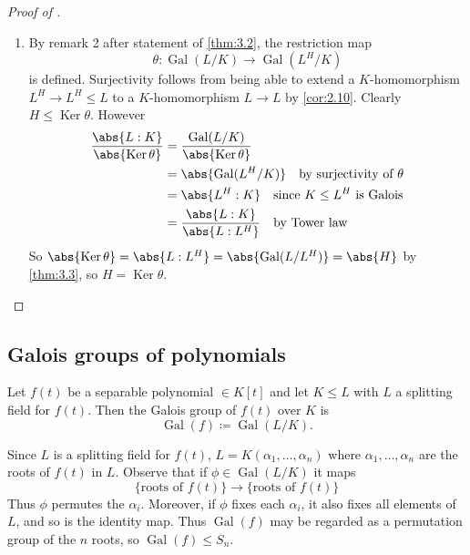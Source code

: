 \documentclass{article}
\DeclareMathOperator{\Gal}{Gal}
\DeclareMathOperator{\Ker}{Ker}
\begin{document}
\begin{proof}[Proof of ]
\begin{enumerate}[label=(\roman*)]
        \item By remark 2 after statement of \cref{thm:3.2}, the restriction map
            \begin{equation*}\theta:\Gal(L/K) \rightarrow \Gal(L^H/K)\end{equation*}
            is defined.
            Surjectivity follows from being able to extend a $K$-homomorphism $L^H \to L^H \leq L$ to a $K$-homomorphism $L \to L$ by \cref{cor:2.10}.
            Clearly $H \leq \Ker \theta$. However
            \begin{align*}
                \frac{\abs{L:K}}{\abs{\Ker \theta}} &= \frac{\Gal(L/K)}{\abs{\Ker \theta}} \\
                                                    &= \abs{\Gal(L^H/K)} \quad \text{by surjectivity of } \theta \\
                                                    &= \abs{L^H:K} \quad \text{since } K \leq L^H \text{ is Galois} \\
                                                    &= \frac{\abs{L:K}}{\abs{L:L^H}} \quad \text{by Tower law}
            \end{align*}
            So $\abs{\Ker \theta} = \abs{L:L^H} = \abs{\Gal(L/L^H)} = \abs{H}$ by \cref{thm:3.3}, so $H = \Ker \theta$.
    \end{enumerate}
\end{proof}

\subsection{Galois groups of polynomials}
\begin{ndef}\label{def:3.5}
    Let $f(t)$ be a separable polynomial $\in K[t]$ and let $K \leq L$ with $L$ a splitting field for $f(t)$.
    Then the Galois group of $f(t)$ over $K$ is
    \begin{equation*}
        \Gal(f) \coloneqq \Gal(L/K).
    \end{equation*}
\end{ndef}

Since $L$ is a splitting field for $f(t)$, $L = K(\alpha_1, \dotsc, \alpha_n)$ where $\alpha_1, \dotsc, \alpha_n$ are the roots of $f(t)$ in $L$.
Observe that if $\phi \in \Gal(L/K)$ it maps
\begin{equation*}
    \{\text{roots of } f(t)\} \longrightarrow \{\text{roots of } f(t)\}
\end{equation*}
Thus $\phi$ permutes the $\alpha_i$.
Moreover, if $\phi$ fixes each $\alpha_i$, it also fixes all elements of $L$, and so is the identity map.
Thus $\Gal(f)$ may be regarded as a permutation group of the $n$ roots, so $\Gal(f) \leq S_n$.
\end{document}
